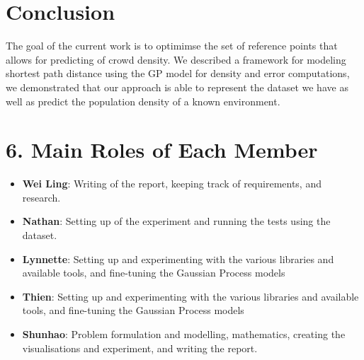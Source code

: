 \documentclass[letterpaper]{article}
\begin{document}
\section{Conclusion}

The goal of the current work is to optimimse the set of reference points that allows for predicting of crowd density. We described a framework for modeling shortest path distance using the GP model for density and error computations, we demonstrated that our approach is able to represent the dataset we have as well as predict the population density of a known environment.

\section{6. Main Roles of Each Member}
\begin{itemize}
\item \textbf{Wei Ling}: 
Writing of the report, keeping track of requirements, and research.
\item \textbf{Nathan}: 
Setting up of the experiment and running the tests using the dataset.
\item \textbf{Lynnette}: 
Setting up and experimenting with the various libraries and available tools, and fine-tuning the Gaussian Process models
\item \textbf{Thien}: 
Setting up and experimenting with the various libraries and available tools, and fine-tuning the Gaussian Process models
\item \textbf{Shunhao}: 
Problem formulation and modelling, mathematics, creating the visualisations and experiment, and writing the report.
\end{itemize}



\end{document}
